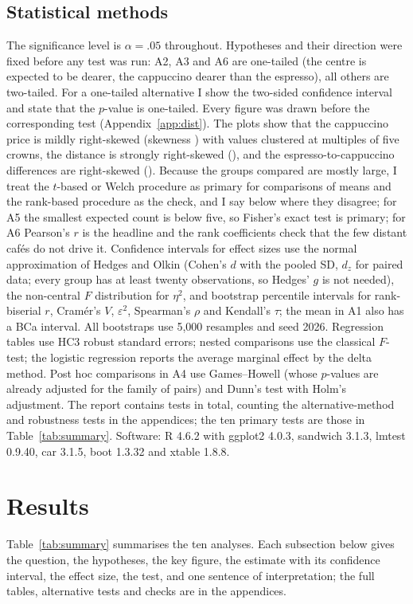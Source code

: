 \documentclass[11pt,a4paper]{article}
\begin{document}
\subsection{Statistical methods}
The significance level is $\alpha = .05$ throughout. Hypotheses and their direction were fixed before any test was run: A2, A3 and A6 are one-tailed (the centre is expected to be dearer, the cappuccino dearer than the espresso), all others are two-tailed. For a one-tailed alternative I show the two-sided confidence interval and state that the $p$-value is one-tailed. Every figure was drawn before the corresponding test (Appendix~\ref{app:dist}). The plots show that the cappuccino price is mildly right-skewed (skewness \PriceSkew{}) with values clustered at multiples of five crowns, the distance is strongly right-skewed (\DistSkew{}), and the espresso-to-cappuccino differences are right-skewed (\DiffSkew{}). Because the groups compared are mostly large, I treat the $t$-based or Welch procedure as primary for comparisons of means and the rank-based procedure as the check, and I say below where they disagree; for A5 the smallest expected count is below five, so Fisher's exact test is primary; for A6 Pearson's $r$ is the headline and the rank coefficients check that the few distant caf\'es do not drive it. Confidence intervals for effect sizes use the normal approximation of Hedges and Olkin (Cohen's $d$ with the pooled SD, $d_z$ for paired data; every group has at least twenty observations, so Hedges' $g$ is not needed), the non-central $F$ distribution for $\eta^2$, and bootstrap percentile intervals for rank-biserial $r$, Cram\'er's $V$, $\varepsilon^2$, Spearman's $\rho$ and Kendall's $\tau$; the mean in A1 also has a BCa interval. All bootstraps use 5{,}000 resamples and seed 2026. Regression tables use HC3 robust standard errors; nested comparisons use the classical $F$-test; the logistic regression reports the average marginal effect by the delta method. Post hoc comparisons in A4 use Games--Howell (whose $p$-values are already adjusted for the family of pairs) and Dunn's test with Holm's adjustment. The report contains \Ntests{} tests in total, counting the alternative-method and robustness tests in the appendices; the ten primary tests are those in Table~\ref{tab:summary}. Software: R 4.6.2 with ggplot2 4.0.3, sandwich 3.1.3, lmtest 0.9.40, car 3.1.5, boot 1.3.32 and xtable 1.8.8.

\section{Results}
Table~\ref{tab:summary} summarises the ten analyses. Each subsection below gives the question, the hypotheses, the key figure, the estimate with its confidence interval, the effect size, the test, and one sentence of interpretation; the full tables, alternative tests and checks are in the appendices.
\end{document}
